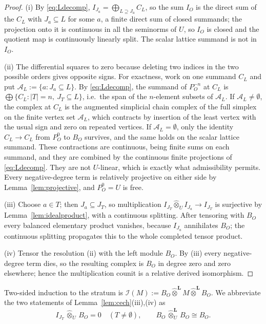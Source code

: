 \documentclass[11pt]{amsart}
\theoremstyle{definition}
\theoremstyle{remark}
\begin{document}
\begin{proof}
(i)  By \eqref{eq:Ldecomp}, $I_{J_a}=\bigoplus_{L\supseteq J_a}C_L$, so the sum
$I_O$ is the direct sum of the $C_L$ with $J_a\subseteq L$ for some $a$, a
finite direct sum of closed summands; the projection onto it is continuous in
all the seminorms of $U$, so $I_O$ is closed and the quotient map is
continuously linearly split.  The scalar lattice summand is not in $I_O$.

(ii)  The differential squares to zero because deleting two indices in the two
possible orders gives opposite signs.  For exactness, work on one summand $C_L$
and put $\mathcal A_L:=\{a:J_a\subseteq L\}$.  By \eqref{eq:Ldecomp}, the
summand of $P_O^{-n}$ at $C_L$ is $\bigoplus\{C_L:|T|=n,\ J_T\subseteq L\}$,
i.e.\ the span of the $n$-element subsets of $\mathcal A_L$.  If
$\mathcal A_L\ne\emptyset$, the complex at $C_L$ is the augmented simplicial
chain complex of the full simplex on the finite vertex set $\mathcal A_L$,
which contracts by insertion of the least vertex with the usual sign and zero
on repeated vertices.  If $\mathcal A_L=\emptyset$, only the identity
$C_L\to C_L$ from $P^0_O$ to $B_O$ survives, and the same holds on the scalar
lattice summand.  These contractions are continuous, being finite sums on each
summand, and they are combined by the continuous finite projections of
\eqref{eq:Ldecomp}.  They are not $U$-linear, which is exactly what
admissibility permits.  Every negative-degree term is relatively projective on
either side by Lemma~\ref{lem:projective}, and $P_O^{0}=U$ is free.

(iii)  Choose $a\in T$; then $J_a\subseteq J_T$, so multiplication
$I_{J_T}\widehat\otimes_UI_{J_a}\to I_{J_T}$ is surjective by
Lemma~\ref{lem:idealproduct}, with a continuous splitting.  After tensoring
with $B_O$ every balanced elementary product vanishes, because $I_{J_a}$
annihilates $B_O$; the continuous splitting propagates this to the whole
completed tensor product.

(iv)  Tensor the resolution (ii) with the left module $B_O$.  By (iii) every
negative-degree term dies, so the resulting complex is $B_O$ in degree zero and
zero elsewhere; hence the multiplication counit is a relative derived
isomorphism.
\end{proof}

Two-sided induction to the stratum is
$\mathcal I(M):=B_O\widehat\otimes^{\mathbf L}M\widehat\otimes^{\mathbf L}B_O$.
We abbreviate the two statements of Lemma~\ref{lem:cech}(iii),(iv) as
\begin{equation}\label{eq:cechvanish}
I_{J_T}\,\widehat\otimes_U\,B_O=0\quad(T\neq\emptyset),\qquad
B_O\,\widehat\otimes^{\mathbf L}_U\,B_O\cong B_O .
\end{equation}
\end{document}
